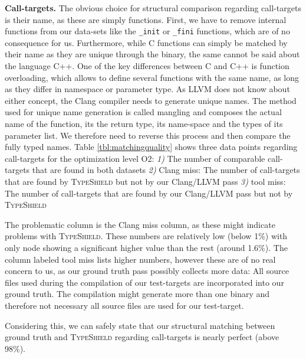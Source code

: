 \textbf{Call-targets.} The obvious choice for structural comparison regarding call-targets is their name, as these are simply functions. 
First, we have to remove internal functions from our data-sets like the \texttt{\_init} or \texttt{\_fini} functions, which are of no consequence for us. 
Furthermore, while C functions can simply be matched by their name as they are unique through the binary, the same cannot be said about the 
language C++. One of the key differences between C and C++ is function overloading, which allows to define several functions with the same name, as 
long as they differ in namespace or parameter type. As LLVM does not know about either concept, the Clang compiler needs to generate unique names. 
The method used for unique name generation is called mangling and composes the actual name of the function, its the return type, its name-space and the 
types of its parameter list. We therefore need to reverse this process and then compare the fully typed names.
Table \ref{tbl:matchingquality} shows three data points regarding call-targets for the optimization level O2:
\textit{1)}  The number of comparable call-targets that are found in both datasets
\textit{2)}  Clang miss: The number of call-targets that are found by \textsc{TypeShield} but not by our Clang/LLVM pass
\textit{3)}  tool miss: The number of call-targets that are found by our Clang/LLVM pass but not by \textsc{TypeShield}

The problematic column is the Clang miss column, as these might indicate problems with \textsc{TypeShield}. These numbers are relatively low (below 1\%) with only node showing a significant higher value than the rest (around 1.6\%). The column labeled tool miss lists 
higher numbers, however these are of no real concern to us, as our ground truth pass possibly collects more data: All source files used during the 
compilation of our test-targets are incorporated into our ground truth. The compilation might generate more than one binary and therefore not 
necessary all source files are used for our test-target.

Considering this, we can safely state that our structural matching between ground truth and \textsc{TypeShield} regarding call-targets is nearly
perfect (above 98\%).


